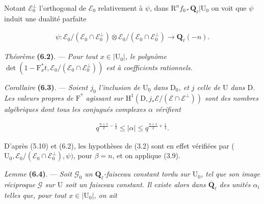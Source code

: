 \documentclass[10pt,leqno]{article}
\begin{document}
\noindent Notant \(\mathcal{E} _{0}^{\perp }\) l’orthogonal de \(\mathcal{E} _{0}\) relativement à \(\psi \), dans \(\mathrm{R}^{n} f_{0*}\mathbf{Q}_{\ell }|\mathrm{U}_{0}\) on voit que \(\psi \) induit une dualité parfaite\par

\begin{equation*}\begin{gathered}\psi  : \mathcal{E} _{0}/(\mathcal{E} _{0}\cap \mathcal{E} _{0}^{\perp })\otimes \mathcal{E} _{0}/(\mathcal{E} _{0}\cap \mathcal{E} _{0}^{\perp }) \longrightarrow  \mathbf{Q}_{\ell }(- n).\end{gathered}\end{equation*}

\noindent \emph{Théorème} \textbf{(6.2)}. — {\itshape Pour tout \(x\in |\mathrm{U}_{0}|\), le polynôme \(\operatorname{det}(1- \mathrm{F}_{x}^{*}t,\mathcal{E} _{0}/(\mathcal{E} _{0}\cap \mathcal{E} _{0}^{\perp }))\) est à coefficients rationnels.}\par

\noindent \emph{Corollaire} \textbf{(6.3)}. — {\itshape Soient \(j_{0}\) l’inclusion de \(\mathrm{U}_{0}\) dans \(\mathrm{D}_{0}\), et \(j\) celle de \(\mathrm{U}\) dans \(\mathrm{D}\). Les valeurs propres de \(\mathrm{F}^{*}\) agissant sur \(\mathrm{H}^{1}(\mathrm{D},j_{*}\mathcal{E} /(\mathcal{E} \cap \mathcal{E} ^{\perp }))\) sont des nombres algébriques dont tous les conjugués complexes \(\alpha \) vérifient}\par

\begin{equation*}\begin{gathered}q^{\frac{n+1}{2}- \frac{1}{2}} \leq  |\alpha | \leq  q^{\frac{n+1}{2}+\frac{1}{2}}.\end{gathered}\end{equation*}

\noindent D’après (5.10) et (6.2), les hypothèses de (3.2) sont en effet vérifiées par (\(\mathrm{U}_{0},\mathcal{E} _{0}/(\mathcal{E} _{0}\cap \mathcal{E} _{0}^{\perp }),\psi )\), pour \(\beta =n\), et on applique (3.9).\par

\noindent \emph{Lemme} \textbf{(6.4)}. — {\itshape Soit \(\mathcal{G} _{0}\) un \(\mathbf{Q}_{\ell }\)-faisceau constant tordu sur \(\mathrm{U}_{0}\), tel que son image réciproque \(\mathcal{G} \) sur \(\mathrm{U}\) soit un faisceau constant. Il existe alors dans \(\overline{\mathbf{Q}}_{\ell }\) des unités \(\alpha _{i}\) telles que, pour tout \(x\in |\mathrm{U}_{0}|\), on ait}\par
\end{document}
